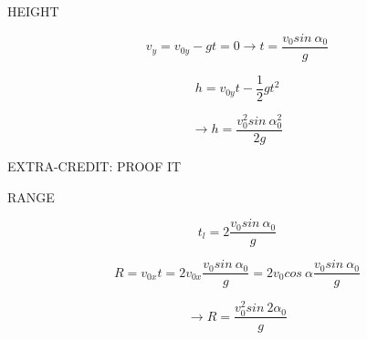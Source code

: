 \documentclass[]{beamer}
\begin{document}
\begin{frame}

  HEIGHT
    \vspace{3mm}

\begin{equation*}
v_y=v_{0y}-gt=0\rightarrow t=\frac{v_{0}sin\ \alpha_0}{g}
\end{equation*} 

\vspace{3mm}

\pause

\begin{equation*}
    h=v_{0y}t-\frac{1}{2}gt^2
\end{equation*} 


\pause



\vspace{3mm}

\pause

\begin{equation*}
\rightarrow  h=\frac{v_{0}^2sin \ \alpha^2_0}{2g}
\end{equation*} 

\vspace{3mm}

\pause

EXTRA-CREDIT: PROOF IT
       
\end{frame}






\begin{frame}

    RANGE
      \vspace{3mm}
  
  \begin{equation*}
t_{l}=2\frac{v_{0}sin{\ \alpha_0}}{g}
  \end{equation*} 

  \begin{equation*}
R=v_{0x}t=2v_{0x}\frac{v_{0}sin{\ \alpha_0}}{g}=2v_{0}cos\ \alpha\frac{v_{0}sin{\ \alpha_0}}{g}
      \end{equation*} 

\begin{equation*}
 \rightarrow   R=\frac{v^2_{0}sin{\ 2\alpha_0}}{g}
\end{equation*}      

  \end{frame}
  
\end{document}
